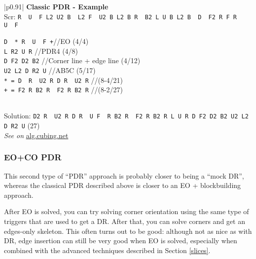 \documentclass[11pt,a4paper]{book}
\newcommand{\p}{\textquotesingle}
\newcommand{\m}{\texttt}
\newcommand{\ps}{\p\,\,}
\newcommand{\comment}[1]{{\color{gray}\quad//#1}}
\begin{document}
\bigskip
\begin{tabular}{|p{}|}
\hline
\textbf{Classic PDR - Example}\\
\hline
Scr: \m{R\ps U\ps F L2 U2 B\ps L2 F\ps U2 B L2 B R\ps B2 L U B L2 B\ps D\ps F2 R F R\ps U\ps F}\\
\hline
\begin{minipage}[l]{0.650\textwidth}
\m{D\ps * R\ps U\ps F +}\comment{EO (4/4)}\\
\m{L R2 U R} \comment{PDR4 (4/8)}\\
\m{D F2 D2 B2} \comment{Corner line + edge line (4/12)}\\
\m{U2 L2 D R2 U} \comment{AB5C (5/17)}\\
\m{* = D\ps R\ps U2 R D R\ps U2 R} \comment{(8-4/21)}\\
\m{+ = F2 R B2 R\ps F2 R B2 R\p} \comment{(8-2/27)}
\end{minipage}
\begin{minipage}[c]{0.25\textwidth}

\end{minipage}\\
\hline
Solution: \m{D2 R\ps U2 R D R\ps U F\ps R B2 R\ps F2 R B2 R L U R D F2 D2 B2 U2 L2 D R2 U} (27)\\
\hline
\emph{See on }\href{https://alg.cubing.net/?setup=R-_U-_F_L2_U2_B-_L2_F-_U2_B_L2_B_R-_B2_L_U_B_L2_B-_D-_F2_R_F_R-_U-_F&alg=D-_R-_U-_F_\%2F\%2F_EO_FB\%0AL_R2_U_R_\%2F\%2F_PDR4\%0AD_F2_D2_B2_\%2F\%2F_CORNER_LINE\%26\%232b\%3B_EDGE_LINE\%0AU2_L2_D_R2_U_\%2F\%2F_AB5C_(17)}{alg.cubing.net}\\
\hline
\end{tabular}
\bigskip

\subsubsection{EO+CO PDR}

This second type of ``PDR'' approach is probably closer to being a ``mock DR'', whereas the classical PDR described above is closer to an EO + blockbuilding approach.

After EO is solved, you can try solving corner orientation using the same type of triggers that are used to get a DR. After that, you can solve corners and get an edges-only skeleton. This often turns out to be good: although not as nice as with DR, edge insertion can still be very good when EO is solved, especially when combined with the advanced techniques described in Section \ref{slices}.
\end{document}
